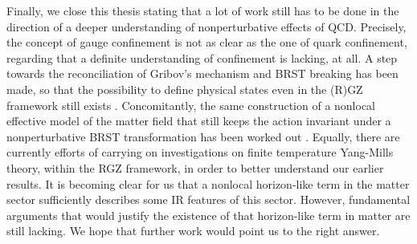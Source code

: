 Finally, we close this thesis stating that a lot of work still has to be done in the direction
of a deeper understanding of nonperturbative effects of QCD. Precisely, the concept of gauge
confinement is not as clear as the one of quark confinement, regarding that a definite
understanding of confinement is lacking, at all. A step towards the reconciliation of Gribov's
mechanism and BRST breaking has been made, so that the possibility to define physical states
even in the (R)GZ framework still exists \cite{Capri:2015ixa,Capri:2015nzw,Capri:2016aqq}.
Concomitantly, the same construction of a nonlocal effective model of the matter field that
still keeps the action invariant under a nonperturbative BRST transformation has been worked
out \cite{Capri:2016aqq}. Equally, there are currently efforts of carrying on investigations 
on finite temperature Yang-Mills theory, within the RGZ framework, in order to better
understand our earlier results. It is becoming clear for us that a nonlocal horizon-like term
in the matter sector sufficiently describes some IR features of this sector. However,
fundamental arguments that would justify the existence of that horizon-like term in
matter are still lacking. We hope that further work would point us to the right answer.













